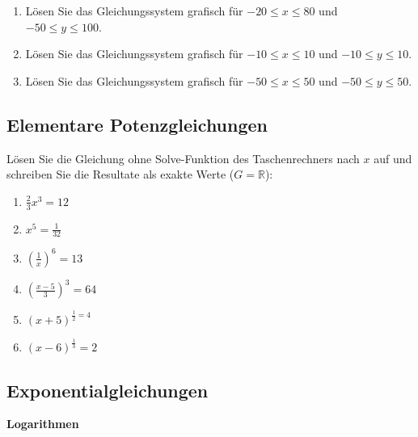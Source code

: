   \begin{enumerate}
  \item Lösen Sie das Gleichungssystem grafisch für
    $-20 \leq x \leq 80$ und $-50 \leq y \leq 100$.


    \item Lösen Sie das Gleichungssystem grafisch für
      $-10 \leq x \leq 10$ und $-10 \leq y \leq 10$.


          \item Lösen Sie das Gleichungssystem grafisch für
      $-50 \leq x \leq 50$ und $-50 \leq y \leq 50$.


  \end{enumerate}

\subsection{Elementare Potenzgleichungen}
Lösen Sie die Gleichung ohne Solve-Funktion des Taschenrechners nach
$x$ auf und schreiben Sie die Resultate als exakte Werte ($G =
\mathbb{R}$):

\begin{multicols}{3}
\begin{enumerate}
\item $\frac{2}{3}x^3 = 12$
\item $x^5 = \frac{1}{32}$
\item $\left(\frac{1}{x}\right)^6 = 13$
\item $\left(\frac{x-5}{3}\right)^3=64$
\item $(x+5)^{\frac{1}{2} = 4}$
\item $\left(x-6\right)^{\frac{1}{3}} = 2$
\end{enumerate}
\end{multicols}




\subsection{Exponentialgleichungen}

\textbf{Logarithmen}

